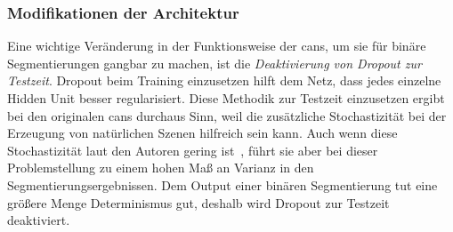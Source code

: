 \subsubsection{Modifikationen der Architektur}

Eine wichtige Veränderung in der Funktionsweise der \glspl{can}, um sie für binäre Segmentierungen gangbar zu machen, ist die \emph{Deaktivierung von Dropout zur Testzeit}.
Dropout beim Training einzusetzen hilft dem Netz, dass jedes einzelne Hidden Unit besser regularisiert.
Diese Methodik zur Testzeit einzusetzen ergibt bei den originalen \glspl{can} durchaus Sinn, weil die zusätzliche Stochastizität bei der Erzeugung von natürlichen Szenen hilfreich sein kann.
Auch wenn diese Stochastizität laut den Autoren gering ist~\cite{Isola.2017}, führt sie aber bei dieser Problemstellung zu einem hohen Maß an Varianz in den Segmentierungsergebnissen.
Dem Output einer binären Segmentierung tut eine größere Menge Determinismus gut, deshalb wird Dropout zur Testzeit deaktiviert.
